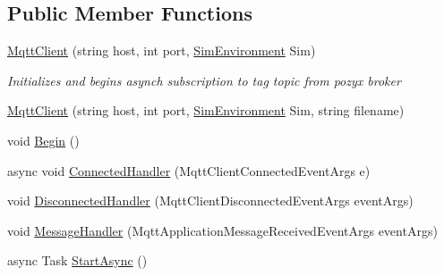 \subsection*{Public Member Functions}
\begin{DoxyCompactItemize}
\item 
\hyperlink{class_pozyx_positioner_1_1_framework_1_1_mqtt_client_a4e2ab3ac03e686e3b85fe50d1a02feb8}{Mqtt\+Client} (string host, int port, \hyperlink{class_pozyx_positioner_1_1_framework_1_1_sim_environment}{Sim\+Environment} Sim)
\begin{DoxyCompactList}\small\item\em Initializes and begins asynch subscription to tag topic from pozyx broker \end{DoxyCompactList}\item 
\hyperlink{class_pozyx_positioner_1_1_framework_1_1_mqtt_client_aed3db79610eeaa328698f435c519c791}{Mqtt\+Client} (string host, int port, \hyperlink{class_pozyx_positioner_1_1_framework_1_1_sim_environment}{Sim\+Environment} Sim, string filename)
\item 
void \hyperlink{class_pozyx_positioner_1_1_framework_1_1_mqtt_client_aa08cbaf1de4adeae85b39edc92791ab9}{Begin} ()
\item 
async void \hyperlink{class_pozyx_positioner_1_1_framework_1_1_mqtt_client_a5e0d99ca6d75c3ee47dc455eb6ff438c}{Connected\+Handler} (Mqtt\+Client\+Connected\+Event\+Args e)
\item 
void \hyperlink{class_pozyx_positioner_1_1_framework_1_1_mqtt_client_adcfdb0246431f7e43d2810b8bf3e0873}{Disconnected\+Handler} (Mqtt\+Client\+Disconnected\+Event\+Args event\+Args)
\item 
void \hyperlink{class_pozyx_positioner_1_1_framework_1_1_mqtt_client_a1fda7c69a63eeeb876490644686b103f}{Message\+Handler} (Mqtt\+Application\+Message\+Received\+Event\+Args event\+Args)
\item 
async Task \hyperlink{class_pozyx_positioner_1_1_framework_1_1_mqtt_client_a92ccb3ea4e84923cfb26c02367fac49e}{Start\+Async} ()
\end{DoxyCompactItemize}
